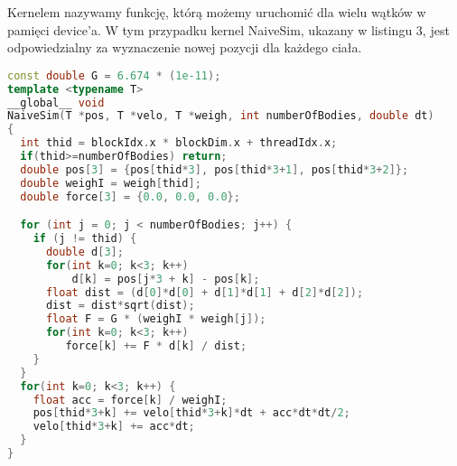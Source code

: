 \documentclass[14pt,twoside,a4paper]{article}
\begin{document}
\bigskip
\bigskip
Kernelem nazywamy funkcję, którą możemy uruchomić dla wielu wątków w pamięci device'a. W tym przypadku kernel NaiveSim, ukazany w listingu 3, jest odpowiedzialny za wyznaczenie nowej pozycji dla każdego ciała. \\
\bigskip

\begin{lstlisting}[language=C++, frame=single, framerule=2pt, caption=Kernel NaiveSim]
const double G = 6.674 * (1e-11);
template <typename T>
__global__ void 
NaiveSim(T *pos, T *velo, T *weigh, int numberOfBodies, double dt) 
{
  int thid = blockIdx.x * blockDim.x + threadIdx.x;
  if(thid>=numberOfBodies) return;
  double pos[3] = {pos[thid*3], pos[thid*3+1], pos[thid*3+2]};
  double weighI = weigh[thid];
  double force[3] = {0.0, 0.0, 0.0};

  for (int j = 0; j < numberOfBodies; j++) {
    if (j != thid) {
      double d[3];
      for(int k=0; k<3; k++) 
      	  d[k] = pos[j*3 + k] - pos[k];
      float dist = (d[0]*d[0] + d[1]*d[1] + d[2]*d[2]);
      dist = dist*sqrt(dist);
      float F = G * (weighI * weigh[j]);
      for(int k=0; k<3; k++) 
		 force[k] += F * d[k] / dist;	
    }
  }
  for(int k=0; k<3; k++) {
    float acc = force[k] / weighI;
    pos[thid*3+k] += velo[thid*3+k]*dt + acc*dt*dt/2;
    velo[thid*3+k] += acc*dt;
  }
}
\end{lstlisting}
\bigskip
\end{document}
